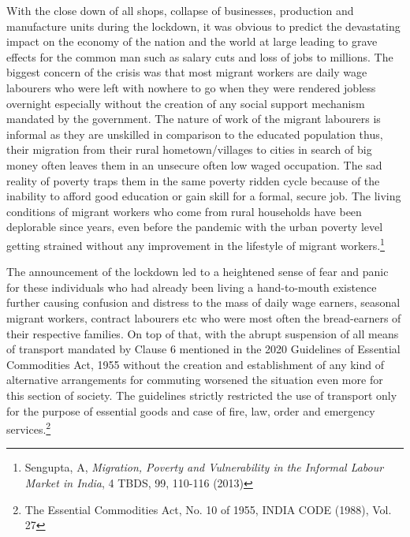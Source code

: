 \begin{multicols}{2}

\noi
With the close down of all shops, collapse of businesses, production and manufacture units
during the lockdown, it was obvious to predict the devastating impact on the economy of the
nation and the world at large leading to grave effects for the common man such as salary cuts
and loss of jobs to millions. The biggest concern of the crisis was that most migrant workers
are daily wage labourers who were left with nowhere to go when they were rendered jobless
overnight especially without the creation of any social support mechanism mandated by the
government. The nature of work of the migrant labourers is informal as they are unskilled in
comparison to the educated population thus, their migration from their rural
hometown/villages to cities in search of big money often leaves them in an unsecure often
low waged occupation. The sad reality of poverty traps them in the same poverty ridden cycle
because of the inability to afford good education or gain skill for a formal, secure job. The
living conditions of migrant workers who come from rural households have been deplorable
since years, even before the pandemic with the urban poverty level getting strained without
any improvement in the lifestyle of migrant workers.\footnote{Sengupta, A, \textit{Migration, Poverty and Vulnerability in the Informal Labour Market in India}, 4 TBDS, 99, 110-116 (2013)}

\noi
The announcement of the lockdown led to a heightened sense of fear and panic for these
individuals who had already been living a hand-to-mouth existence further causing confusion
and distress to the mass of daily wage earners, seasonal migrant workers, contract labourers
etc who were most often the bread-earners of their respective families. On top of that, with
the abrupt suspension of all means of transport mandated by Clause 6 mentioned in the 2020
Guidelines of Essential Commodities Act, 1955 without the creation and establishment of any
kind of alternative arrangements for commuting worsened the situation even more for this section of society. The guidelines strictly restricted the use of transport only for the purpose
of essential goods and case of fire, law, order and emergency services.\footnote{The Essential Commodities Act, No. 10 of 1955, INDIA CODE (1988), Vol. 27}


\end{multicols}
